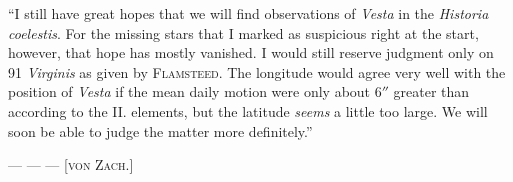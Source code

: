 \par\indent “I still have great hopes that we will find observations of \emph{Vesta} in the \emph{Historia coelestis}. For the missing stars that I marked as suspicious right at the start, however, that hope has mostly vanished. I would still reserve judgment only on 91 \emph{Virginis} as given by
%
\textsc{Flamsteed}. The longitude would agree very well with the position of \emph{Vesta} if the mean daily motion were only about $6''$ greater than according to the II. elements, but the latitude \emph{seems} a little too large. We will soon be able to judge the matter more definitely.”

--- --- ---
\hfill [\textsc{von Zach}.]
